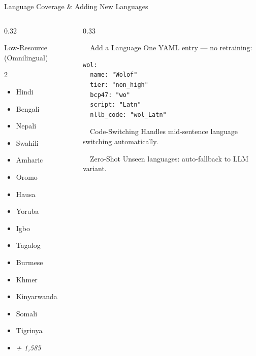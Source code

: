 \documentclass[aspectratio=169, 11pt]{beamer}
\begin{document}
\begin{frame}[fragile]{Language Coverage \& Adding New Languages}
\begin{columns}[T]
\begin{column}{0.32\textwidth}
\begin{block}{\scriptsize Low-Resource (Omnilingual)}
\begin{multicols}{2}
\begin{itemize}
                        \tiny
                        \item Hindi
                        \item Bengali
                        \item Nepali
                        \item Swahili
                        \item Amharic
                        \item Oromo
                        \item Hausa
                        \item Yoruba
                        \item Igbo
                        \item Tagalog
                        \item Burmese
                        \item Khmer
                        \item Kinyarwanda
                        \item Somali
                        \item Tigrinya
                        \item \textit{+ 1,585}
                    \end{itemize}
                \end{multicols}
            \end{block}
        \end{column}
        \begin{column}{0.33\textwidth}
            \begin{exampleblock}{\faPlus\ \ Add a Language}
                \scriptsize
                One YAML entry --- no retraining:
                \begin{lstlisting}[basicstyle=\ttfamily\tiny, frame=none, backgroundcolor=\color{lightbg}]
wol:
  name: "Wolof"
  tier: "non_high"
  bcp47: "wo"
  script: "Latn"
  nllb_code: "wol_Latn"
                \end{lstlisting}
            \end{exampleblock}
            \vspace{0.1em}
            \begin{alertblock}{\faExchangeAlt\ \ Code-Switching}
                \scriptsize
                Handles mid-sentence language switching automatically.
            \end{alertblock}
            \vspace{0.1em}
            \begin{block}{\faGlobeAmericas\ \ Zero-Shot}
                \scriptsize
                Unseen languages: auto-fallback to LLM variant.
            \end{block}
        \end{column}
    \end{columns}
\end{frame}
\end{document}
